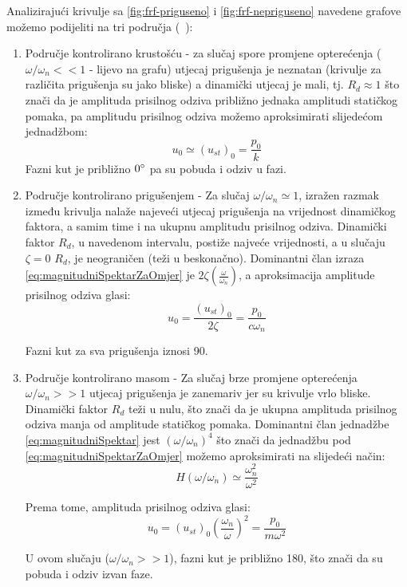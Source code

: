 Analizirajući krivulje sa \eqref{fig:frf-priguseno} i \eqref{fig:frf-nepriguseno} 
navedene grafove možemo podijeliti na tri područja (~\cite{chopra2011}):
\begin{enumerate}
    \item Područje kontrolirano krustošću - za slučaj spore promjene opterećenja
        ($\omega/\omega_n<<1$ - lijevo na grafu) utjecaj prigušenja je neznatan
        (krivulje za različita prigušenja su jako bliske) a dinamički utjecaj je mali, 
        tj. $R_d \approx 1$ što znači da je amplituda prisilnog odziva približno jednaka
        amplitudi statičkog pomaka, pa amplitudu prisilnog odziva možemo
        aproksimirati slijedećom jednadžbom:
        \begin{equation}\label{eq:frf_prvi_sektor}
            u_0\simeq(u_{st})_0=\frac{p_0}{k}
        \end{equation}
        Fazni kut je približno $0\degree$ pa su pobuda i odziv u fazi.

    \item Područje kontrolirano prigušenjem - Za slučaj $\omega/\omega_n\simeq 1$,
        izražen razmak između krivulja nalaže najeveći utjecaj prigušenja na
        vrijednost dinamičkog faktora, a samim time i na ukupnu amplitudu prisilnog
        odziva. Dinamički faktor $R_d$, u navedenom intervalu, postiže najveće
        vrijednosti, a u slučaju $\zeta=0$ $R_d$, je neograničen (teži u beskonačno). 
        Dominantni član izraza \eqref{eq:magnitudniSpektarZaOmjer} je
        $2\zeta(\frac{\omega}{\omega_n})$, a aproksimacija amplitude prisilnog
        odziva glasi: 
        \begin{equation}\label{eq:frf_rezonanca}
            u_0=\frac{(u_{st})_0}{2\zeta}=\frac{p_0}{c\omega_n}
        \end{equation}

        Fazni kut za sva prigušenja iznosi 90\degree. 

    \item Područje kontrolirano masom - Za slučaj brze promjene opterećenja
        $\omega/\omega_n>>1$ utjecaj prigušenja je zanemariv jer su krivulje vrlo
        bliske. Dinamički faktor $R_d$ teži u nulu, što znači da je ukupna amplituda
        prisilnog odziva manja od amplitude statičkog pomaka. Dominantni član jednadžbe 
        \eqref{eq:magnitudniSpektar} jest $(\omega/\omega_n)^4$ što znači
        da jednadžbu pod \eqref{eq:magnitudniSpektarZaOmjer} možemo aproksimirati na 
        slijedeći način:
        \[
            H(\omega/\omega_n)\simeq \frac{\omega_n^2}{\omega^2}
        \]

        Prema tome, amplituda prisilnog odziva glasi:
        \begin{equation}\label{eq:frf_treci_sektor}
            u_0=(u_{st})_0\left(\frac{\omega_n}{\omega}\right)^2=\frac{p_0}{m\omega^2}
        \end{equation}
        
        U ovom slučaju ($\omega/\omega_n >> 1$), fazni kut je približno 180\degree,
        što znači da su pobuda i odziv izvan faze.
\end{enumerate}



